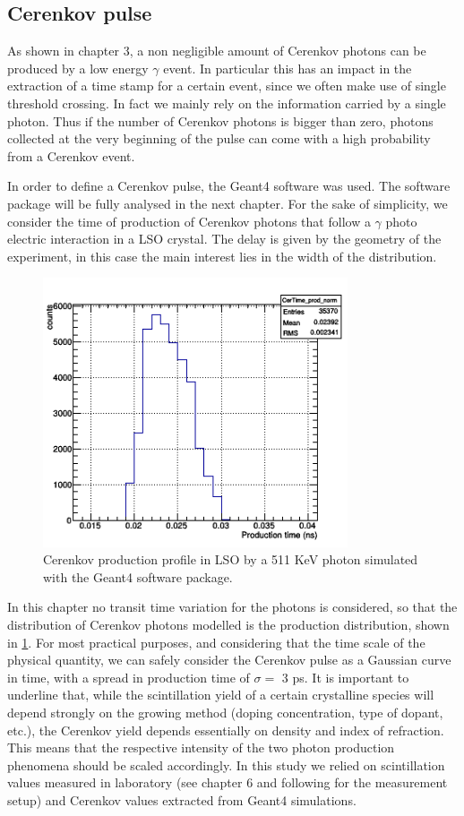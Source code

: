 \subsection{Cerenkov pulse}
As shown in chapter 3, a non negligible amount of Cerenkov photons can be produced by a low energy $\gamma$ event. 
In particular this has an impact in the extraction of a time stamp for a certain event, since we often make use of single threshold crossing. In fact we mainly rely on the information carried by a single photon. Thus if the number of Cerenkov photons is bigger than zero, photons collected at the very beginning of the pulse can come with a high probability from a Cerenkov event.

In order to define a Cerenkov pulse, the Geant4 software was used. The software package will be fully analysed in the next chapter. For the sake of simplicity, we consider the time of production of Cerenkov photons that follow a $\gamma$ photo electric interaction in a LSO crystal. The delay is given by the geometry of the experiment, in this case the main interest lies in the width of the distribution.
\begin{figure}[htbp]
\begin{center}
\includegraphics[width=9cm]{../Pictures/Chapter_4/cerenkov_time.png}
\end{center}
\caption[Cerenkov production]{Cerenkov production profile in LSO by a 511 KeV photon simulated with the Geant4 software package.}
\label{fig:cer_see}
\end{figure}
In this chapter no transit time variation for the photons is considered, so that the distribution of Cerenkov photons modelled is the production distribution, shown in \ref{fig:cer_see}. 
For most practical purposes, and considering that the time scale of the physical quantity, we can safely consider the Cerenkov pulse as a Gaussian curve in time, with a spread in production time of $\sigma =$ 3 ps.
It is important to underline that, while the scintillation yield of a certain crystalline species will depend strongly on the growing method (doping concentration, type of dopant, etc.), the Cerenkov yield depends essentially on density and index of refraction. This means that the respective intensity of the two photon production phenomena should be scaled accordingly. In this study we relied on scintillation values measured in laboratory (see chapter 6 and following for the measurement setup) and Cerenkov values extracted from Geant4 simulations.

